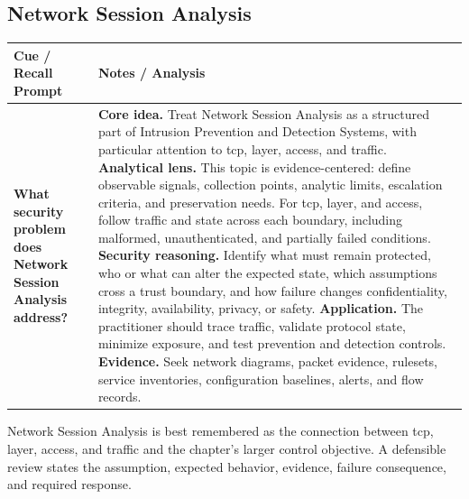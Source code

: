 \documentclass[11pt]{article}
\newcommand{\CornellHeader}{%
\rowcolor{Navy}\color{white}\bfseries Cue / Recall Prompt & \color{white}\bfseries Notes / Analysis\\\hline}
\newcommand{\CornellRow}[2]{%
\cellcolor{CueGray}\RaggedRight\textbf{#1} & \RaggedRight #2\\\hline}
\begin{document}
\subsection*{Network Session Analysis}
\begin{longtable}{>{\RaggedRight\arraybackslash}p{}|>{\RaggedRight\arraybackslash}p{}}
\CornellHeader
\CornellRow{What security problem does Network Session Analysis address?}{\textbf{Core idea.} Treat Network Session Analysis as a structured part of Intrusion Prevention and Detection Systems, with particular attention to tcp, layer, access, and traffic. \textbf{Analytical lens.} This topic is evidence-centered: define observable signals, collection points, analytic limits, escalation criteria, and preservation needs. For tcp, layer, and access, follow traffic and state across each boundary, including malformed, unauthenticated, and partially failed conditions. \textbf{Security reasoning.} Identify what must remain protected, who or what can alter the expected state, which assumptions cross a trust boundary, and how failure changes confidentiality, integrity, availability, privacy, or safety. \textbf{Application.} The practitioner should trace traffic, validate protocol state, minimize exposure, and test prevention and detection controls. \textbf{Evidence.} Seek network diagrams, packet evidence, rulesets, service inventories, configuration baselines, alerts, and flow records.}
\end{longtable}
\begin{topicsummary}
Network Session Analysis is best remembered as the connection between tcp, layer, access, and traffic and the chapter's larger control objective. A defensible review states the assumption, expected behavior, evidence, failure consequence, and required response.
\end{topicsummary}
\end{document}

